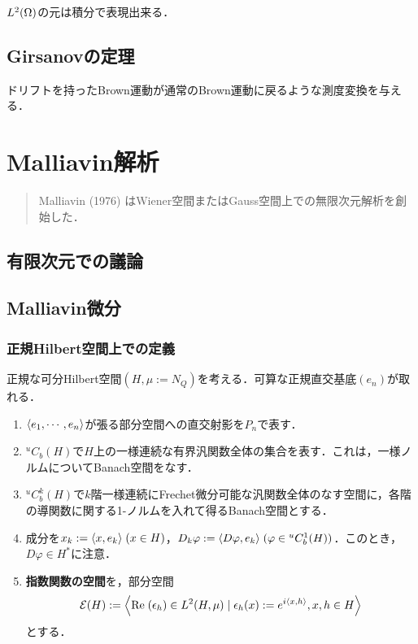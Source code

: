 \documentclass[uplatex,dvipdfmx]{jsreport}
\begin{document}
\begin{tcolorbox}[colframe=ForestGreen, colback=ForestGreen!10!white,breakable,colbacktitle=ForestGreen!40!white,coltitle=black,fonttitle=\bfseries\sffamily,
title=]
    $L^2(\Omega)$の元は積分で表現出来る．
\end{tcolorbox}

\section{Girsanovの定理}

\begin{tcolorbox}[colframe=ForestGreen, colback=ForestGreen!10!white,breakable,colbacktitle=ForestGreen!40!white,coltitle=black,fonttitle=\bfseries\sffamily,
title=]
    ドリフトを持ったBrown運動が通常のBrown運動に戻るような測度変換を与える．
\end{tcolorbox}

\chapter{Malliavin解析}

\begin{quotation}
    Malliavin (1976) はWiener空間またはGauss空間上での無限次元解析を創始した．
\end{quotation}

\section{有限次元での議論}

\section{Malliavin微分}

\subsection{正規Hilbert空間上での定義}

\begin{notation}
    正規な可分Hilbert空間$(H,\mu:=N_Q)$を考える．可算な正規直交基底$(e_n)$が取れる．
    \begin{enumerate}
        \item $\langle e_1,\cdots,e_n\rangle$が張る部分空間への直交射影を$P_n$で表す．
        \item ${}^uC_b(H)$で$H$上の一様連続な有界汎関数全体の集合を表す．これは，一様ノルムについてBanach空間をなす．
        \item ${}^uC_b^k(H)$で$k$階一様連続にFrechet微分可能な汎関数全体のなす空間に，各階の導関数に関する1-ノルムを入れて得るBanach空間とする．
        \item 成分を$x_k:=\langle x,e_k\rangle\;(x\in H)$，$D_k\varphi:=\langle D\varphi,e_k\rangle\;(\varphi\in {}^uC_b^1(H))$．このとき，$D\varphi\in H^*$に注意．
        \item \textbf{指数関数の空間}を，部分空間
        \[\mathcal{E}(H):=\left\langle\mathrm{Re}\;(\epsilon_h)\in L^2(H,\mu)\mid \epsilon_h(x):=e^{i\langle x,h\rangle},x,h\in H\right\rangle\]
        とする．
    \end{enumerate}
\end{notation}
\end{document}
